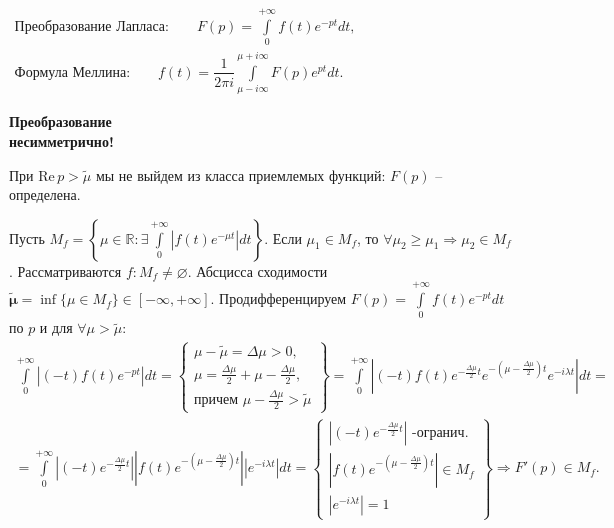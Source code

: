 \documentclass[oneside, final, 12pt]{article}
\theoremstyle{def}
\begin{document}
	\begin{minipage}{0.4\textwidth}
		$
			\begin{gathered}
			 	\textbf{Преобразование Лапласа:} \qquad
			 		F(p) = \int\limits_{0}^{+\infty} f(t) e^{-pt}dt,  \\
				\textbf{Формула Меллина:} \qquad	
					f(t) =  \dfrac{1}{2\pi i} \int\limits_{\mu-i\infty}^{\mu+i\infty} F(p)e^{pt} d t. 
			\end{gathered} 
		$
	\end{minipage}
	\hfill
	\begin{minipage}{0.3\textwidth}
		\textbf{Преобразование \\ несимметрично!} \vspace{3mm}
	\end{minipage} \newline
	\noindent
	При $\textrm{Re}\, p >\widetilde{\mu}$ мы не выйдем из класса приемлемых функций: $F(p)$ -- определена.
	
	Пусть $M_f = \left\{ \mu \in \mathbb{R}: \exists \int\limits_{0}^{+\infty}|f(t)e^{-\mu t}|dt \right \}$. 
	Если $\mu_1\in M_f$, то $\forall \mu_2\geqslant \mu_1 \Rightarrow \mu_2 \in M_f$. \newline
	Рассматриваются $f: M_f \neq \varnothing$. Абсцисса сходимости $\boldsymbol{\widetilde{\mu}} 
		\boldsymbol{= }\inf\{ \mu \in M_f\} \in [-\infty,+\infty].$ \newline
	Продифференцируем $F(p)=\int\limits_{0}^{+\infty}f(t) e^{-pt}dt$ по $p$ и для $\forall\mu>\widetilde{\mu}$:
	$$
		\begin{gathered}
			\int\limits_{0}^{+\infty} \left|(-t)f(t) e^{-pt}\right|dt  = 
						\begin{Bmatrix}	
							\mu - \widetilde{\mu} = \Delta \mu >0, \\
							\mu = \frac{\Delta \mu}{2} + \mu - \frac{\Delta \mu}{2}, \\
							\text{причем } \mu - \frac{\Delta \mu}{2} > \widetilde{\mu}
						\end{Bmatrix} 
						= \int\limits_{0}^{+\infty}  \left|(-t) f(t) e^{-\frac{\Delta \mu}{2} t}
																			e^{-\left(\mu - \frac{\Delta \mu}{2}\right)t}
																			e^{-i\lambda t} \right| dt = \\
						= \int\limits_{0}^{+\infty}  \left|(-t)e^{-\frac{\Delta \mu}{2} t} \right|
																   \left|  f(t) e^{-\left(\mu - \frac{\Delta \mu}{2}\right)t} \right|
																 	\left|	e^{-i\lambda t} \right| dt =
												\begin{Bmatrix}	
													\left|(-t)e^{-\frac{\Delta \mu}{2} t} \right| \text{ -огранич.}\\
													\left|  f(t) e^{-\left(\mu - \frac{\Delta \mu}{2}\right)t} \right| \in M_f \\
													\left|	e^{-i\lambda t} \right| = 1
												\end{Bmatrix} \Rightarrow F'(p) \in M_f.
		\end{gathered}	
	$$
	 
\end{document}
